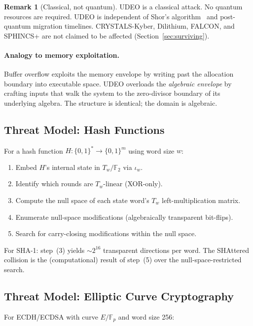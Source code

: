 \documentclass[runningheads]{llncs}
\theoremstyle{plain}
\theoremstyle{definition}
\newtheorem{remark}[theorem]{Remark}
\newcommand{\GFtwo}{\mathbb{F}_2}
\newcommand{\Fp}{\mathbb{F}_p}
\begin{document}
\begin{remark}[Classical, not quantum]
UDEO is a classical attack. No quantum resources are required. UDEO is
independent of Shor's algorithm~\cite{Shor1994} and post-quantum migration
timelines. CRYSTALS-Kyber, Dilithium, FALCON, and SPHINCS+ are not claimed
to be affected (Section~\ref{sec:surviving}).
\end{remark}

\paragraph{Analogy to memory exploitation.}
Buffer overflow exploits the memory envelope by writing past the allocation
boundary into executable space. UDEO overloads the \emph{algebraic envelope}
by crafting inputs that walk the system to the zero-divisor boundary of its
underlying algebra. The structure is identical; the domain is algebraic.

\subsection{Threat Model: Hash Functions}

For a hash function $H: \{0,1\}^* \to \{0,1\}^m$ using word size $w$:

\begin{enumerate}
\item Embed $H$'s internal state in $T_w/\GFtwo$ via $\iota_w$.
\item Identify which rounds are $T_w$-linear (XOR-only).
\item Compute the null space of each state word's $T_w$ left-multiplication matrix.
\item Enumerate null-space modifications (algebraically transparent bit-flips).
\item Search for carry-closing modifications within the null space.
\end{enumerate}

For SHA-1: step~(3) yields $\sim 2^{16}$ transparent directions per word.
The SHAttered collision is the (computational) result of step~(5) over
the null-space-restricted search.

\subsection{Threat Model: Elliptic Curve Cryptography}

For ECDH/ECDSA with curve $E / \Fp$ and word size 256:
\end{document}
